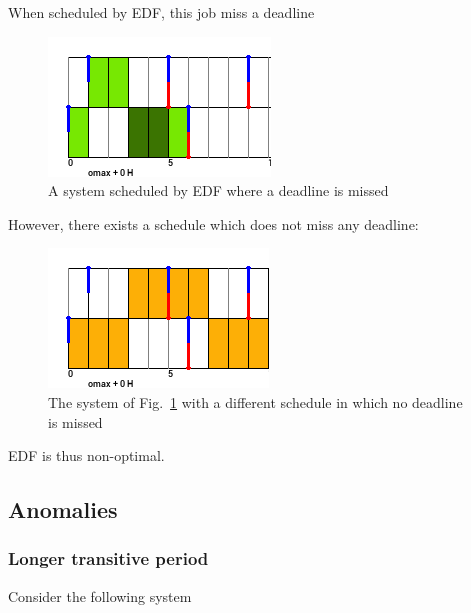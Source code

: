 \documentclass[a4paper,10pt]{article}
\begin{document}
        When scheduled by EDF, this job miss a deadline\\

        \begin{figure}[h]
        \begin{center}
            \includegraphics{figs/edfNonOptimal_EDF.png}
            \caption{A system scheduled by EDF where a deadline is missed}
            \label{fig:edfnonoptimal_edf}
        \end{center}
        \end{figure}

        However, there exists a schedule which does not miss any deadline:\\

        \begin{figure}[h]
        \begin{center}
            \includegraphics{figs/edfNonOptimal_PALLF.png}
            \caption{The system of Fig.~\ref{fig:edfnonoptimal_edf} with a different schedule in which no deadline is missed}
            \label{fig:edfnonoptimal_pallf}
        \end{center}
        \end{figure}

        EDF is thus non-optimal.

    \subsection{Anomalies}

        \subsubsection{Longer transitive period}
        Consider the following system
\end{document}
